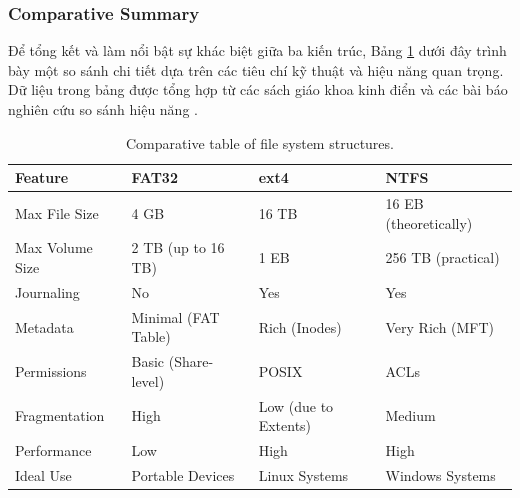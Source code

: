 \documentclass[12pt]{article}
\begin{document}
\subsubsection{Comparative Summary}
Để tổng kết và làm nổi bật sự khác biệt giữa ba kiến trúc, Bảng \ref{tab:fs_comparison} dưới đây trình bày một so sánh chi tiết dựa trên các tiêu chí kỹ thuật và hiệu năng quan trọng. Dữ liệu trong bảng được tổng hợp từ các sách giáo khoa kinh điển và các bài báo nghiên cứu so sánh hiệu năng \parencite{Dhjaku2019, Bundele2018}.

 
 \begin{table}[H]
     \centering
     \caption{Comparative table of file system structures.}
     \label{tab:fs_comparison}
     \begin{tabular}{@{}llll@{}}
         \toprule
         \textbf{Feature} & \textbf{FAT32} & \textbf{ext4} & \textbf{NTFS} \\ 
         \midrule
         Max File Size     & 4 GB                  & 16 TB                 & 16 EB (theoretically) \\
         Max Volume Size   & 2 TB (up to 16 TB)    & 1 EB                  & 256 TB (practical)    \\
         Journaling        & No                  & Yes                 & Yes                 \\
         Metadata          & Minimal (FAT Table)   & Rich (Inodes)         & Very Rich (MFT)       \\
         Permissions       & Basic (Share-level)   & POSIX                 & ACLs                  \\
         Fragmentation     & High                  & Low (due to Extents)  & Medium                \\
         Performance       & Low                   & High                  & High                  \\
         Ideal Use         & Portable Devices      & Linux Systems         & Windows Systems       \\ 
         \bottomrule
     \end{tabular}
 \end{table}



\end{document}
